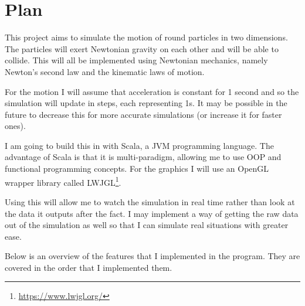 \section{Plan}
	This project aims to simulate the motion of round particles in two dimensions. The particles will exert Newtonian gravity on each other and will be able to collide. This will all be implemented using Newtonian mechanics, namely Newton's second law and the kinematic laws of motion.
	
	For the motion I will assume that acceleration is constant for 1 second and so the simulation will update in steps, each representing 1s. It may be possible in the future to decrease this for more accurate simulations (or increase it for faster ones).
	
	I am going to build this in with Scala, a JVM programming language. The advantage of Scala is that it is multi-paradigm, allowing me to use OOP and functional programming concepts. For the graphics I will use an OpenGL wrapper library called LWJGL\footnote{\url{https://www.lwjgl.org/}}.
	
	Using this will allow me to watch the simulation in real time rather than look at the data it outputs after the fact. I may implement a way of getting the raw data out of the simulation as well so that I can simulate real situations with greater ease.
	
	Below is an overview of the features that I implemented in the program. They are covered in the order that I implemented them.